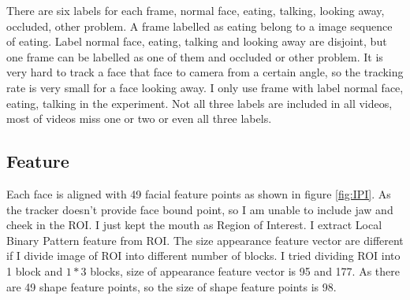 \newline
There are six labels for each frame, normal face, eating, talking, looking away, occluded, other problem. A frame labelled as eating belong to a image sequence of eating. Label normal face, eating, talking and looking away are disjoint, but one frame can be labelled as one of them and occluded or other problem. It is very hard to track a face that face to camera from a certain angle, so the tracking rate is very small for a face looking away. I only use frame with label normal face, eating, talking in the experiment. Not all three labels are included in all videos, most of videos miss one or two or even all three labels.
\subsection{Feature}
Each face is aligned with 49 facial feature points as shown in figure \ref{fig:IPI}. As the tracker doesn't provide face bound point, so I am unable to include jaw and cheek in the ROI. I just kept the mouth as Region of Interest. I extract Local Binary Pattern feature from ROI. The size appearance feature vector are different if I divide image of ROI into different number of blocks. I tried dividing ROI into 1 block and $1*3$ blocks, size of appearance feature vector is 95 and 177. As there are 49 shape feature points, so the size of shape feature points is 98.
